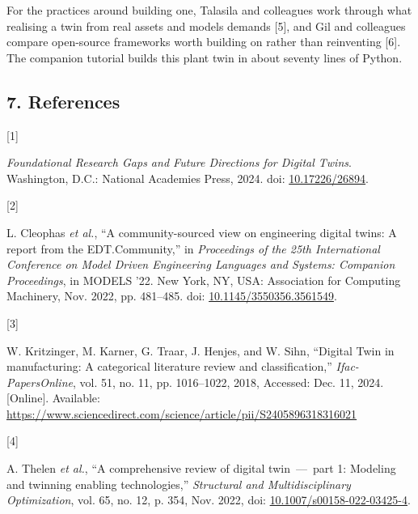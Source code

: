 \documentclass[
  12pt,
  a4paper,
]{article}
\newlength{\cslhangindent}
\newlength{\csllabelwidth}
\newenvironment{CSLReferences}[2] %
 {\begin{list}{}{%
  \setlength{\itemindent}{0pt}
  \setlength{\leftmargin}{0pt}
  \setlength{\parsep}{0pt}
  \ifodd #1
   \setlength{\leftmargin}{\cslhangindent}
   \setlength{\itemindent}{-1\cslhangindent}
  \fi
  \setlength{\itemsep}{#2\baselineskip}}}
 {\end{list}}
\newcommand{\CSLLeftMargin}[1]{\parbox[t]{\csllabelwidth}{\strut#1\strut}}
\newcommand{\CSLRightInline}[1]{\parbox[t]{\linewidth - \csllabelwidth}{\strut#1\strut}}
\begin{document}
For the practices around building one, Talasila and colleagues work
through what realising a twin from real assets and models demands
{[}5{]}, and Gil and colleagues compare open-source frameworks worth
building on rather than reinventing {[}6{]}. The companion tutorial
builds this plant twin in about seventy lines of Python.

\subsection{7. References}\label{references}

\protect{}\label{refs}
\begin{CSLReferences}{0}{0}
\CSLLeftMargin{{[}1{]} }%
\CSLRightInline{\emph{Foundational {Research} {Gaps} and {Future}
{Directions} for {Digital} {Twins}}. Washington, D.C.: National
Academies Press, 2024. doi:
\href{https://doi.org/10.17226/26894}{10.17226/26894}.}

\CSLLeftMargin{{[}2{]} }%
\CSLRightInline{L. Cleophas \emph{et al.}, {``A community-sourced view
on engineering digital twins: A report from the {EDT}.{Community},''} in
\emph{Proceedings of the 25th {International} {Conference} on {Model}
{Driven} {Engineering} {Languages} and {Systems}: {Companion}
{Proceedings}}, in {MODELS} '22. New York, NY, USA: Association for
Computing Machinery, Nov. 2022, pp. 481--485. doi:
\href{https://doi.org/10.1145/3550356.3561549}{10.1145/3550356.3561549}.}

\CSLLeftMargin{{[}3{]} }%
\CSLRightInline{W. Kritzinger, M. Karner, G. Traar, J. Henjes, and W.
Sihn, {``Digital {Twin} in manufacturing: {A} categorical literature
review and classification,''} \emph{Ifac-PapersOnline}, vol. 51, no. 11,
pp. 1016--1022, 2018, Accessed: Dec. 11, 2024. {[}Online{]}. Available:
\url{https://www.sciencedirect.com/science/article/pii/S2405896318316021}}

\CSLLeftMargin{{[}4{]} }%
\CSLRightInline{A. Thelen \emph{et al.}, {``A comprehensive review of
digital twin~---~part 1: Modeling and twinning enabling technologies,''}
\emph{Structural and Multidisciplinary Optimization}, vol. 65, no. 12,
p. 354, Nov. 2022, doi:
\href{https://doi.org/10.1007/s00158-022-03425-4}{10.1007/s00158-022-03425-4}.}


\end{CSLReferences}
\end{document}
